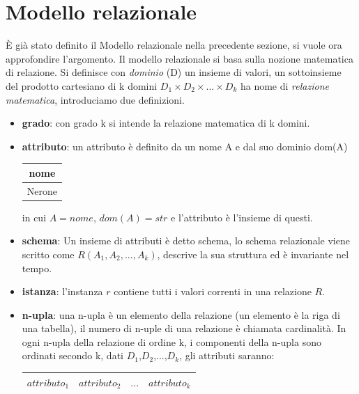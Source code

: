 \documentclass{article}
\begin{document}
\section{Modello relazionale}
    È già stato definito il Modello relazionale nella precedente sezione, si vuole ora approfondire l'argomento.
    Il modello relazionale si basa sulla nozione matematica di relazione. Si definisce con \textit{dominio} (D) un insieme di valori, un sottoinsieme del prodotto cartesiano di k domini $D_1\times D_2 \times ...\times D_k$ ha nome di \textit{relazione matematica}, introduciamo due definizioni.
    
    \begin{itemize}
        \item \textbf{grado}:
            con grado k si intende la relazione matematica di k domini.

        \item \textbf{attributo}:
            un attributo è definito da un nome A e dal suo dominio dom(A)

            \begin{tabular}{|c|}
                \hline
                \textbf{nome}\\
                \hline
                Nerone\\
                \hline

            \end{tabular}
            
            in cui $A=nome$, $dom(A)=str$ e l'attributo è l'insieme di questi.
        
        \item \textbf{schema}:
            Un insieme di attributi è detto schema, lo schema relazionale viene scritto come $R(A_1,A_2,...,A_k)$, descrive la sua struttura ed è invariante nel tempo.
        
        \item \textbf{istanza}:
            l'instanza $r$ contiene tutti i valori correnti in una relazione $R$. 

        \item \textbf{n-upla}:
            una n-upla è un elemento della relazione (un elemento è la riga di una tabella), il numero di n-uple di una relazione è chiamata cardinalità. In ogni n-upla della relazione di ordine k, i componenti della n-upla sono ordinati secondo k, dati $D_1$,$D_2$,...,$D_k$, gli attributi saranno:

            \begin{tabular}{|c |c |c |c|}
                \hline
                $attributo_1$&$attributo_2$&$...$&$attributo_k$\\
                \hline
            \end{tabular}
            

\end{itemize}
\end{document}
